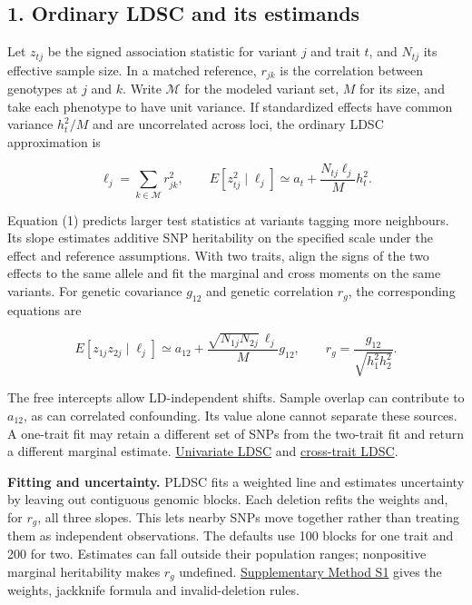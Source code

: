 \documentclass[11pt,a4paper]{article}
\let\reportsection\subsection
\newif\ifinsupplement
\renewcommand{\subsection}[1]{\clearpage
  \ifstrequal{#1}{Supplementary Methods}{\insupplementtrue
    \fancyhead[R]{\small\sffamily Supplementary methods}}{}
  \reportsection{#1}}
\begin{document}
\subsection{1. Ordinary LDSC and its estimands}\label{1-ordinary-ldsc-and-its-estimands}

Let \(z_{tj}\) be the signed association statistic for variant \(j\) and trait \(t\), and \(N_{tj}\) its effective sample size. In a matched reference, \(r_{jk}\) is the correlation between genotypes at \(j\) and \(k\). Write \(\mathcal M\) for the modeled variant set, \(M\) for its size, and take each phenotype to have unit variance. If standardized effects have common variance \(h_t^2/M\) and are uncorrelated across loci, the ordinary LDSC approximation is

\[
\ell_j=\sum_{k\in\mathcal M} r_{jk}^2,\qquad
E[z_{tj}^2\mid\ell_j]\simeq a_t+\frac{N_{tj}\ell_j}{M}h_t^2. \tag{1}
\]

Equation (1) predicts larger test statistics at variants tagging more neighbours. Its slope estimates additive SNP heritability on the specified scale under the effect and reference assumptions. With two traits, align the signs of the two effects to the same allele and fit the marginal and cross moments on the same variants. For genetic covariance \(g_{12}\) and genetic correlation \(r_g\), the corresponding equations are

\[
E[z_{1j}z_{2j}\mid\ell_j]\simeq a_{12}
+\frac{\sqrt{N_{1j}N_{2j}}\,\ell_j}{M}g_{12},\qquad
r_g=\frac{g_{12}}{\sqrt{h_1^2h_2^2}}. \tag{2}
\]

The free intercepts allow LD-independent shifts. Sample overlap can contribute to \(a_{12}\), as can correlated confounding. Its value alone cannot separate these sources. A one-trait fit may retain a different set of SNPs from the two-trait fit and return a different marginal estimate. \href{https://doi.org/10.1038/ng.3211}{Univariate LDSC} and \href{https://doi.org/10.1038/ng.3406}{cross-trait LDSC}.

\textbf{Fitting and uncertainty.} PLDSC fits a weighted line and estimates uncertainty by leaving out contiguous genomic blocks. Each deletion refits the weights and, for \(r_g\), all three slopes. This lets nearby SNPs move together rather than treating them as independent observations. The defaults use 100 blocks for one trait and 200 for two. Estimates can fall outside their population ranges; nonpositive marginal heritability makes \(r_g\) undefined. \hyperref[s1-regression-weights-and-uncertainty]{Supplementary Method S1} gives the weights, jackknife formula and invalid-deletion rules.
\end{document}
